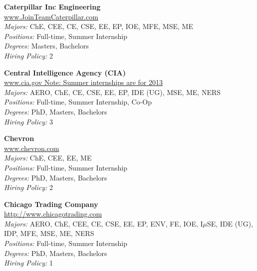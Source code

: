 \documentclass{article}
\begin{document}
\begin{center}
\begin{multicols}{3}
\begin{minipage}{.9\columnwidth}{\Large\bf Caterpillar Inc Engineering }\\
	\url{www.JoinTeamCaterpillar.com}\\
	\emph{Majors:} ChE, CEE, CE, CSE, EE, EP, IOE, MFE, MSE, ME\\
	\emph{Positions:} Full-time, Summer Internship\\
	\emph{Degrees:} Masters, Bachelors\\
	\emph{Hiring Policy:} 2\\
\end{minipage}
 
\begin{minipage}{.9\columnwidth}{\Large\bf Central Intelligence Agency (CIA) }\\
	\url{www.cia.gov Note: Summer internships are for 2013}\\
	\emph{Majors:} AERO, ChE, CE, CSE, EE, EP, IDE (UG), MSE, ME, NERS\\
	\emph{Positions:} Full-time, Summer Internship, Co-Op\\
	\emph{Degrees:} PhD, Masters, Bachelors\\
	\emph{Hiring Policy:} 3\\
\end{minipage}
 
\begin{minipage}{.9\columnwidth}{\Large\bf Chevron }\\
	\url{www.chevron.com}\\
	\emph{Majors:} ChE, CEE, EE, ME\\
	\emph{Positions:} Full-time, Summer Internship\\
	\emph{Degrees:} PhD, Masters, Bachelors\\
	\emph{Hiring Policy:} 2\\
\end{minipage}
 
\begin{minipage}{.9\columnwidth}{\Large\bf Chicago Trading Company }\\
	\url{http://www.chicagotrading.com}\\
	\emph{Majors:} AERO, ChE, CEE, CE, CSE, EE, EP, ENV, FE, IOE, I$\mu$SE, IDE (UG), IDP, MFE, MSE, ME, NERS\\
	\emph{Positions:} Full-time, Summer Internship\\
	\emph{Degrees:} PhD, Masters, Bachelors\\
	\emph{Hiring Policy:} 1\\
\end{minipage}
 

\end{multicols}
\end{center}
\end{document}
